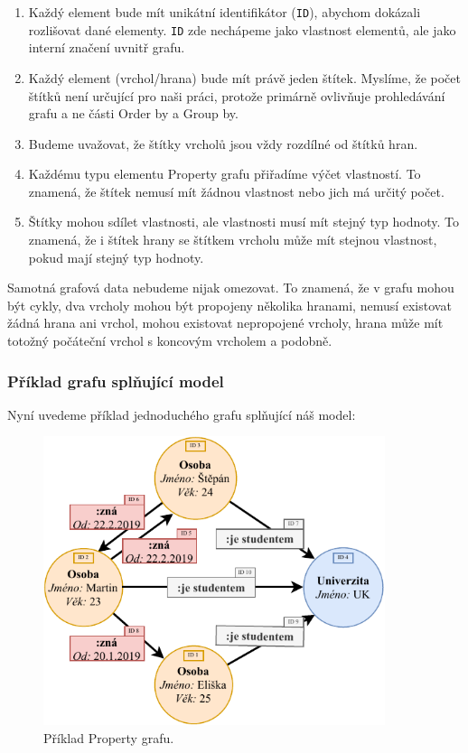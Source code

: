 \begin{enumerate}

\item
Každý element bude mít unikátní identifikátor (\texttt{ID}), abychom dokázali rozlišovat dané elementy.
\texttt{ID} zde nechápeme jako vlastnost elementů, ale jako interní značení uvnitř grafu.

\item
Každý element (vrchol/hrana) bude mít právě jeden štítek.
Myslíme, že počet štítků není určující pro naši práci, protože primárně ovlivňuje prohledávání grafu a ne části Order by a Group by.

\item
Budeme uvažovat, že štítky vrcholů jsou vždy rozdílné od štítků hran.

\item
Každému typu elementu Property grafu přiřadíme výčet vlastností.
To znamená, že štítek nemusí mít žádnou vlastnost nebo jich má určitý počet.

\item
Štítky mohou sdílet vlastnosti, ale vlastnosti musí mít stejný typ hodnoty.
To znamená, že i štítek hrany se štítkem vrcholu může mít stejnou vlastnost, pokud mají stejný typ hodnoty.

\end{enumerate}

Samotná grafová data nebudeme nijak omezovat.
To znamená, že v grafu mohou být cykly, dva vrcholy mohou být propojeny několika hranami, nemusí existovat žádná hrana ani vrchol, mohou existovat nepropojené vrcholy, hrana může mít totožný počáteční vrchol s koncovým vrcholem a podobně.

\subsubsection{Příklad grafu splňující model}
Nyní uvedeme příklad jednoduchého grafu splňující náš model:

\begin{figure}[!htp]
\includegraphics[width=100mm]{../img/propertyexample.pdf}\centering
\caption{Příklad Property grafu.}
\label{figure.propertygraphexample}
\end{figure}


